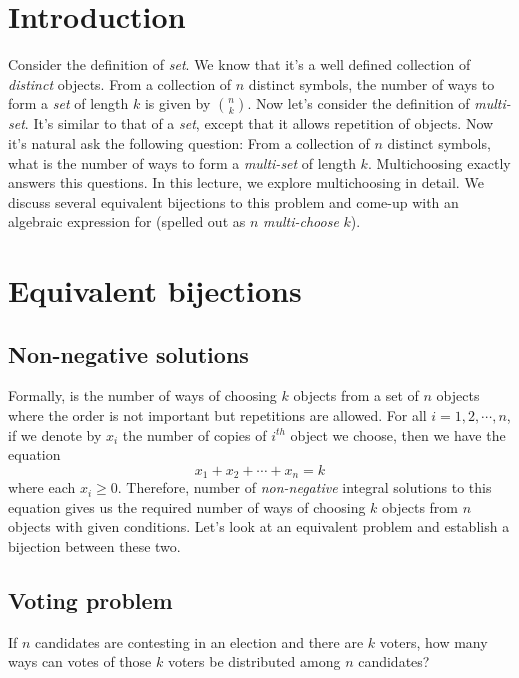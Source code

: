 
\section{Introduction}
Consider the definition of \emph{set}. We know that it's a well defined collection of \emph{distinct} objects. From a collection of $n$ distinct symbols, the number of ways to form a \emph{set} of length $k$ is given by $\binom{n}{k}$. Now let's consider the definition of \emph{multi-set}. It's similar to that of a \emph{set}, except that it allows repetition of objects. Now it's natural ask the following question: From a collection of $n$ distinct symbols, what is the number of ways to form a \emph{multi-set} of length $k$. Multichoosing exactly answers this questions. In this lecture, we explore multichoosing in detail. We discuss several equivalent bijections to this problem and come-up with an algebraic expression for  (spelled out as $n$ \emph{multi-choose} $k$).

\section{Equivalent bijections} \label{sec:equi-bij}
\subsection{Non-negative solutions}\label{non-neq-sol-prob}
Formally,  is the number of ways of choosing $k$ objects from a set of $n$ objects where the order is not important but repetitions are allowed. For all $i=1,2,\cdots,n$, if we denote by $x_i$ the number of copies of $i^{th}$ object we choose, then we have the equation \begin{equation}\label{eqn1}
    x_1+x_2+\cdots+x_n=k
\end{equation} where each $x_i \geq 0$. Therefore, number of \emph{non-negative} integral solutions to this equation gives us the required number of ways of choosing $k$ objects from $n$ objects with given conditions. Let's look at an equivalent problem and establish a bijection between these two.

\subsection{Voting problem}\label{voting-prob} If $n$ candidates are contesting in an election and there are $k$ voters, how many ways can votes of those $k$ voters be distributed among $n$ candidates? 

